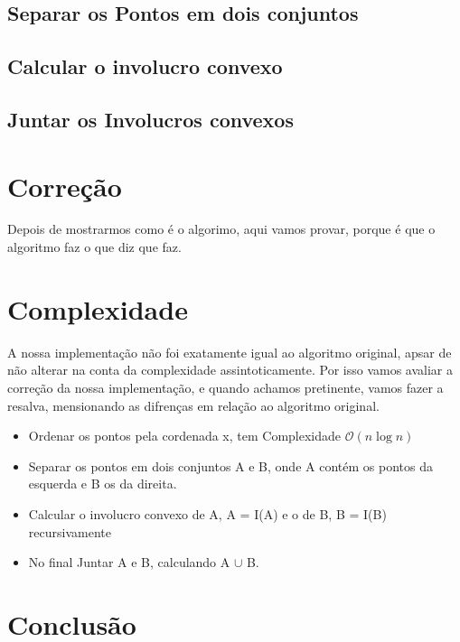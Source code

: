 \documentclass[11pt]{article}
\begin{document}
\subsection{ Separar os Pontos em dois conjuntos}

\subsection{ Calcular o involucro convexo } 

\subsection{ Juntar os Involucros convexos } 


\section{Correção}
Depois de mostrarmos como é o algorimo,
aqui vamos provar, porque é que o algoritmo faz o que diz que faz.

\section{Complexidade}
A nossa implementação não foi exatamente igual ao algoritmo original,
apsar de não alterar na conta da complexidade assintoticamente.
Por isso vamos avaliar a correção da nossa implementação, e quando 
achamos pretinente, vamos fazer a resalva, mensionando as difrenças 
em relação ao algoritmo original.

\begin{itemize}
    \item Ordenar os pontos pela cordenada x, tem Complexidade $\mathcal{O}(n\log{}n)$
    \item Separar os pontos em dois conjuntos A e B, onde A contém os pontos da esquerda e B os da direita.
    \item Calcular o involucro convexo de A, A = I(A) e o de B, B = I(B) recursivamente
    \item No final Juntar A e B, calculando A $\cup$ B.
\end{itemize}

\section{Conclusão}
\end{document}
